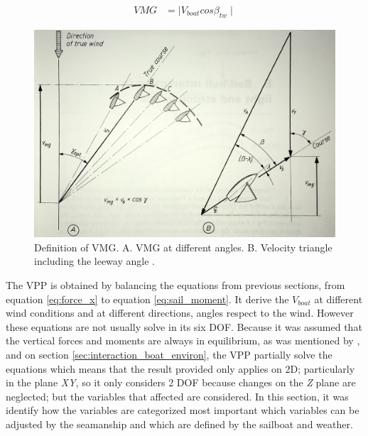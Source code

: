 \begin{equation}\label{eq:VMG}
\begin{aligned}
VMG &=  \mid V_{boat} cos \beta_{tw} \mid 
\end{aligned}
\end {equation}

\begin{figure}
    \centering
    \includegraphics[width=0.75\linewidth]{images/vmg_march.jpeg}
    \caption{Definition of VMG. A. VMG at  different angles. B. Velocity triangle including the leeway angle \cite{marchajaereo1979}.}
    \label{fig:vmg_marchal_book}
\end{figure}
The VPP is obtained by balancing the equations from previous sections, from equation \ref{eq:force_x} to equation \ref{eq:sail_moment}. It derive the $V_{boat}$ at different wind conditions and at different directions, angles respect to the wind. 
However these equations are not usually solve in its six DOF. Because it was assumed that the vertical forces and moments are always in equilibrium, as was mentioned by \cite{larsonprinciples}, \cite{fossati2009aero} and on section \ref{sec:interaction_boat_environ},  the VPP partially solve the equations which means that the result provided only applies on 2D; particularly in the plane \textit{XY}, so it only considers 2 DOF  because changes on the \textit{Z} plane are neglected; but the variables that affected are considered. In this section, it was identify how the variables are categorized most important which variables can be adjusted by the seamanship and which are defined by the sailboat and weather. 

